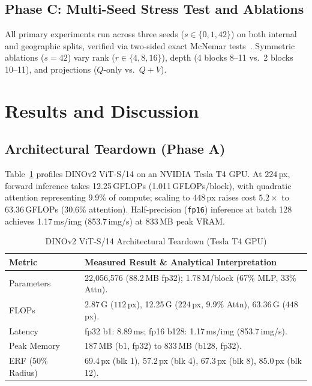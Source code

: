 \documentclass[conference]{IEEEtran}
\begin{document}
\subsection{Phase C: Multi-Seed Stress Test and Ablations}
All primary experiments run across three seeds ($s \in \{0, 1, 42\}$) on both internal and geographic splits, verified via two-sided exact McNemar tests~\cite{mcnemar1947note}. Symmetric ablations ($s=42$) vary rank ($r \in \{4, 8, 16\}$), depth (4 blocks 8--11 vs.\ 2 blocks 10--11), and projections ($Q$-only vs.\ $Q+V$).

\section{Results and Discussion}

\subsection{Architectural Teardown (Phase A)}
Table~\ref{tab:teardown} profiles DINOv2 ViT-S/14 on an NVIDIA Tesla T4 GPU. At $224$\,px, forward inference takes 12.25\,GFLOPs (1.011\,GFLOPs/block), with quadratic attention representing 9.9\% of compute; scaling to $448$\,px raises cost $5.2\times$ to 63.36\,GFLOPs (30.6\% attention). Half-precision (\texttt{fp16}) inference at batch 128 achieves 1.17\,ms/img (853.7\,img/s) at 833\,MB peak VRAM.

\begin{table}[t]
\centering
\caption{DINOv2 ViT-S/14 Architectural Teardown (Tesla T4 GPU)}
\label{tab:teardown}
\footnotesize
\begin{tabularx}{\linewidth}{@{}lX@{}}
\toprule
\textbf{Metric} & \textbf{Measured Result \& Analytical Interpretation} \\
\midrule
Parameters & 22,056,576 (88.2\,MB fp32); 1.78\,M/block (67\% MLP, 33\% Attn). \\
FLOPs & 2.87\,G ($112$\,px), 12.25\,G ($224$\,px, 9.9\% Attn), 63.36\,G ($448$\,px). \\
Latency & fp32 b1: 8.89\,ms; fp16 b128: 1.17\,ms/img (853.7\,img/s). \\
Peak Memory & 187\,MB (b1, fp32) to 833\,MB (b128, fp32). \\
ERF (50\% Radius) & 69.4\,px (blk 1), 57.2\,px (blk 4), 67.3\,px (blk 8), 85.0\,px (blk 12). \\
\bottomrule
\end{tabularx}
\end{table}
\end{document}
